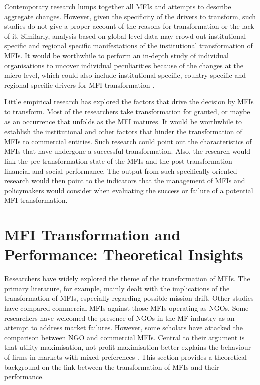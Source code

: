 \documentclass[a4paper, nobind]{templates/ociamthesis}
\begin{document}
Contemporary research lumps together all MFIs and attempts to describe aggregate changes. However, given the specificity of the drivers to transform, such studies do not give a proper account of the reasons for transformation or the lack of it. Similarly, analysis based on global level data may crowd out institutional specific and regional specific manifestations of the institutional transformation of MFIs. It would be worthwhile to perform an in-depth study of individual organisations to uncover individual peculiarities because of the changes at the micro level, which could also include institutional specific, country-specific and regional specific drivers for MFI transformation \autocite{mersland2009performance}.

Little empirical research has explored the factors that drive the decision by MFIs to transform. Most of the researchers take transformation for granted, or maybe as an occurrence that unfolds as the MFI matures. It would be worthwhile to establish the institutional and other factors that hinder the transformation of MFIs to commercial entities. Such research could point out the characteristics of MFIs that have undergone a successful transformation. Also, the research would link the pre-transformation state of the MFIs and the post-transformation financial and social performance. The output from such specifically oriented research would then point to the indicators that the management of MFIs and policymakers would consider when evaluating the success or failure of a potential MFI transformation.

\hypertarget{mfi-transformation-and-performance-theoretical-insights}{%
\section{MFI Transformation and Performance: Theoretical Insights}\label{mfi-transformation-and-performance-theoretical-insights}}

\noindent Researchers have widely explored the theme of the transformation of MFIs. The primary literature, for example,\autocite{campion1999institutional,mersland2010microfinance} mainly dealt with the implications of the transformation of MFIs, especially regarding possible mission drift. Other studies have compared commercial MFIs against those MFIs operating as NGOs. Some researchers have welcomed the presence of NGOs in the MF industry as an attempt to address market failures. However, some scholars have attacked the comparison between NGO and commercial MFIs. Central to their argument is that utility maximisation, not profit maximisation better explains the behaviour of firms in markets with mixed preferences \autocite{bos2015practice}. This section provides a theoretical background on the link between the transformation of MFIs and their performance.
\end{document}
